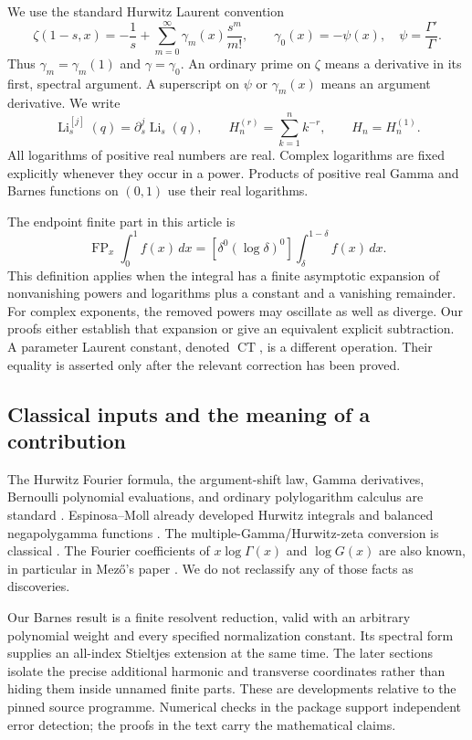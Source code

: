\documentclass[11pt]{article}
\numberwithin{equation}{section}
\theoremstyle{plain}
\theoremstyle{definition}
\theoremstyle{remark}
\DeclareMathOperator{\Li}{Li}
\DeclareMathOperator{\FP}{FP}
\DeclareMathOperator{\CT}{CT}
\begin{document}
We use the standard Hurwitz Laurent convention
\begin{equation}\label{bhr:eq:stieltjes-convention}
 \zeta(1-s,x)=-\frac1s+
    \sum_{m=0}^{\infty}\gamma_m(x)\frac{s^m}{m!},
 \qquad \gamma_0(x)=-\psi(x),\quad \psi=\frac{\Gamma'}\Gamma.
\end{equation}
Thus $\gamma_m=\gamma_m(1)$ and $\gamma=\gamma_0$.
An ordinary prime on $\zeta$ means a derivative in its first,
spectral argument. A superscript on $\psi$ or $\gamma_m(x)$ means
an argument derivative. We write
\[
 \Li_s^{[j]}(q)=\partial_s^j\Li_s(q),\qquad
 H_n^{(r)}=\sum_{k=1}^n k^{-r},\qquad H_n=H_n^{(1)}.
\]
All logarithms of positive real numbers are real. Complex logarithms
are fixed explicitly whenever they occur in a power. Products of
positive real Gamma and Barnes functions on $(0,1)$ use their real
logarithms.

The endpoint finite part in this article is
\begin{equation}\label{bhr:eq:fp-definition}
 \FP_x\int_0^1 f(x)\,dx
   = [\delta^0(\log\delta)^0]
       \int_{\delta}^{1-\delta}f(x)\,dx.
\end{equation}
This definition applies when the integral has a finite asymptotic
expansion of nonvanishing powers and logarithms plus a constant and a
vanishing remainder. For complex exponents, the removed powers may
oscillate as well as diverge. Our proofs either establish that expansion or
give an equivalent explicit subtraction. A parameter Laurent
constant, denoted $\CT$, is a different operation. Their equality
is asserted only after the relevant correction has been proved.

\subsection{Classical inputs and the meaning of a contribution}

The Hurwitz Fourier formula, the argument-shift law, Gamma
derivatives, Bernoulli polynomial evaluations, and ordinary
polylogarithm calculus are standard \cite{bhr:DLMFZ,bhr:DLMFG}.
Espinosa--Moll already developed Hurwitz integrals and balanced
negapolygamma functions \cite{bhr:EMIntegrals,bhr:EMGeneralized}.
The multiple-Gamma/Hurwitz-zeta conversion is classical
\cite{bhr:Adamchik,bhr:Vardi}. The Fourier coefficients of
$x\log\Gamma(x)$ and $\log G(x)$ are also known, in particular in
Mez\H{o}'s paper \cite{bhr:Mezo}. We do not reclassify any of those
facts as discoveries.

Our Barnes result is a finite resolvent reduction, valid with an
arbitrary polynomial weight and every specified normalization
constant. Its spectral form supplies an all-index Stieltjes
extension at the same time. The later sections isolate the precise
additional harmonic and transverse coordinates rather than hiding
them inside unnamed finite parts. These are developments relative
to the pinned source programme. Numerical checks in the package
support independent error detection; the proofs in the text carry
the mathematical claims.
\end{document}

